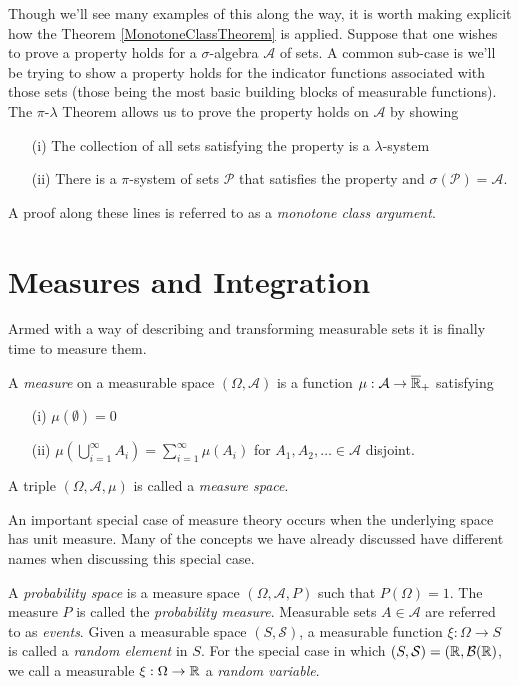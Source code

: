 Though we'll see many examples of this along the way, it is worth
making explicit how the Theorem \ref{MonotoneClassTheorem} is applied.
Suppose that one wishes to prove a property holds for a
$\sigma$-algebra $\mathcal{A}$ of sets.  A common sub-case is we'll be trying to show a
property holds for the indicator functions associated with those sets
(those being the most basic building blocks of measurable functions).
The $\pi$-$\lambda$ Theorem allows us to prove the property holds on
$\mathcal{A}$ by showing 
\begin{itemize}
\item[(i)] The collection of all sets satisfying the property is a $\lambda$-system
\item[(ii)] There is a $\pi$-system of sets $\mathcal{P}$ that
  satisfies the property and $\sigma(\mathcal{P}) = \mathcal{A}$.
\end{itemize}
A proof along these lines is referred to as a \emph{monotone class
  argument}.

\section{Measures and Integration}
Armed with a way of describing and transforming measurable sets it is
finally time to measure them.
\begin{defn}A \emph{measure} on a measurable space $(\Omega,
  \mathcal{A})$ is a function $\mu : \mathcal{A} \to
  \overline{\mathbb{R}}_+$ satisfying
\begin{itemize}
\item[(i)] $\mu(\emptyset) = 0$
\item[(ii)] $\mu(\bigcup_{i=1}^\infty A_i) = \sum_{i=1}^\infty \mu(A_i)$
  for $A_1, A_2, \dots \in \mathcal{A}$ disjoint.
\end{itemize}
A triple $(\Omega, \mathcal{A}, \mu)$ is called a \emph{measure space}.
\end{defn}

An important special case of measure theory occurs when the underlying
space has unit measure.  Many of the concepts we have already
discussed have different names when discussing this special case.
\begin{defn}A \emph{probability space} is a measure space $(\Omega,
  \mathcal{A}, P)$ such that $P(\Omega) = 1$.  The measure $P$ is
  called the \emph{probability measure}.  Measurable sets $A \in
  \mathcal{A}$ are referred to as \emph{events}.  Given a measurable
  space $(S, \mathcal{S})$, a measurable function $\xi : \Omega \to S$
  is called a \emph{random element} in $S$.  For the special case in
  which $(S, \mathcal{S}) = (\mathbb{R}, \mathcal{B}(\mathbb{R})$, we call a
  measurable $\xi : \Omega \to \mathbb{R}$ a \emph{random variable}.
\end{defn}

